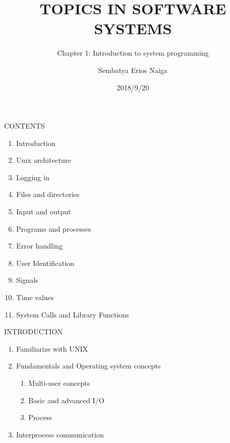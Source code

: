 \documentclass{beamer}
\title[Basics OF UNIX]{TOPICS IN SOFTWARE SYSTEMS}
\subtitle{Chapter 1: Introduction to system programming}
\author{Sembatya Erios Naiga}
\date{2018/9/20}
\begin{document}
\begin{frame}
\titlepage
\end{frame}

\begin{frame}[t]{CONTENTS}\vspace{4pt}
\begin{enumerate}
\item Introduction
\item Unix architecture
\item Logging in
\item Files and directories
\item Input and output
\item Programs and processes
\item Error handling
\item User Identification
\item Signals
\item Time values
\item System Calls and Library Functions
\end{enumerate}

\end{frame}


\begin{frame}[t]{INTRODUCTION}\vspace{10pt}
\begin{enumerate}
\item Familiarize with UNIX
\item Fundamentals and Operating system concepts 
      \begin{enumerate}
      \item Multi-user concepts
      \item Basic and advanced I/O
      \item Process 
      \end{enumerate}       
\item Interprocess communication
\end{enumerate}

\end{frame}
\end{document}
